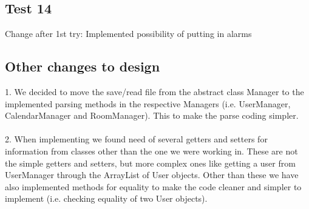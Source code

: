 \subsection{Test 14}
Change after 1st try: Implemented possibility of putting in alarms

\subsection{Other changes to design}
1. We decided to move the save/read file from the abstract class Manager to the implemented parsing methods in the respective Managers (i.e. UserManager, CalendarManager and RoomManager). This to make the parse coding simpler.\\
\\
2. When implementing we found need of several getters and setters for information from classes other than the one we were working in. These are not the simple getters and setters, but more complex ones like getting a user from UserManager through the ArrayList of User objects. Other than these we have also implemented methods for equality to make the code cleaner and simpler to implement (i.e. checking equality of two User objects).

